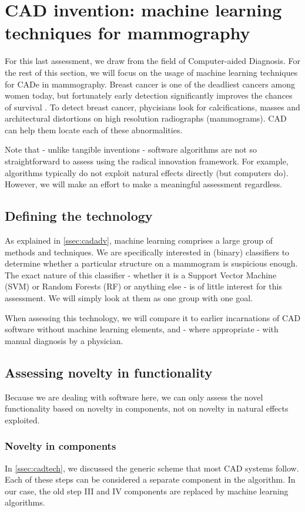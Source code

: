 \section{CAD invention: machine learning techniques for mammography}
For this last assessment, we draw from the field of Computer-aided Diagnosis.
For the rest of this section, we will focus on the usage of machine learning
techniques for CADe in mammography. Breast cancer is one of the deadliest
cancers among women today, but fortunately early detection significantly
improves the chances of survival \cite{mammoairecent}. To detect breast cancer,
phycisians look for calcifications, masses and architectural distortions on
high resolution radiographs (mammograms). CAD can help them locate each of these
abnormalities.

Note that - unlike tangible inventions - software algorithms are not so
straightforward to assess using the radical innovation framework. For example,
algorithms typically do not exploit natural effects directly (but computers do).
However, we will make an effort to make a meaningful assessment regardless.


\subsection{Defining the technology}
As explained in \autoref{ssec:cadadv}, machine learning comprises a large group
of methods and techniques. We are specifically interested in (binary)
classifiers to determine whether a particular structure on a mammogram is
suspicious enough. The exact nature of this classifier - whether it is a Support
Vector Machine (SVM) or Random Forests (RF) or anything else - is of little
interest for this assessment. We will simply look at them as one group with one goal.

When assessing this technology, we will compare it to earlier incarnations of
CAD software without machine learning elements, and - where appropriate - with
manual diagnosis by a physician.

\subsection{Assessing novelty in functionality}
Because we are dealing with software here, we can only assess the novel
functionality based on novelty in components, not on novelty in natural effects
exploited. 

\subsubsection{Novelty in components}
In \autoref{ssec:cadtech}, we discussed the generic scheme that most CAD systems
follow. Each of these steps can be considered a separate component in the
algorithm. In our case, the old step III and IV components are replaced by
machine learning algorithms.

